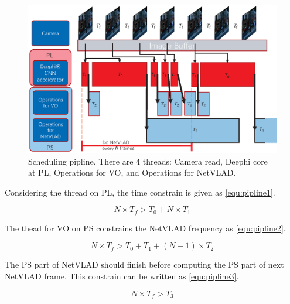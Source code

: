 \begin{figure}[t]
    \centering  
    \includegraphics[width=0.95\linewidth]{fig/pipeline.eps}
    \caption{Scheduling pipline. There are 4 threads: Camera read, Deephi core at PL, Operations for VO, and Operations for NetVLAD.}
    \label{fig:pipline}
\end{figure}


Considering the thread on PL, the time constrain is given as \cref{equ:pipline1}. 

\begin{equation}
    N \times T_{f} > T_{0} + N \times T_{1}
    \label{equ:pipline1}
\end{equation}

The thead for VO on PS constrains the NetVLAD frequency as \cref{equ:pipline2}.

\begin{equation}
    N \times T_{f} > T_{0} + T_{1} + (N-1) \times T_{2}
    \label{equ:pipline2}
\end{equation}

The PS part of NetVLAD should finish before computing the PS part of next NetVLAD frame. This constrain can be written as \cref{equ:pipline3}.


\begin{equation}
    N \times T_{f} > T_{3}
    \label{equ:pipline3}
\end{equation}
